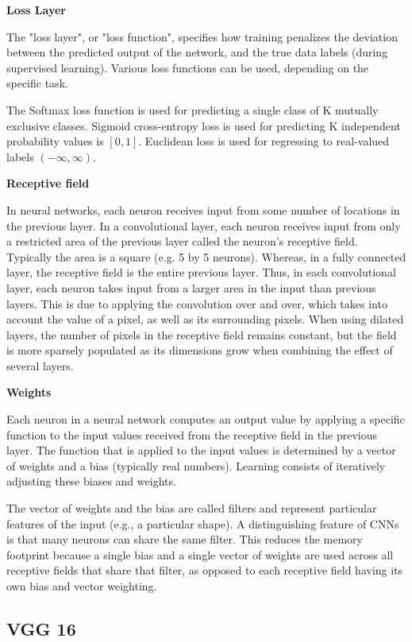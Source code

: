 \documentclass[11pt]{article}
\begin{document}
	\textbf{Loss Layer}

	The "loss layer", or "loss function", specifies how training penalizes the
	deviation between the predicted output of the network, and the true data
	labels (during supervised learning). Various loss functions can be used,
	depending on the specific task.

	The Softmax loss function is used for predicting a single class of K
	mutually exclusive classes. Sigmoid cross-entropy loss is used for
	predicting K independent probability values is $[0, 1]$.  Euclidean loss is
	used for regressing to real-valued labels $(- \infty, \infty)$.

	\textbf{Receptive field}

	In neural networks, each neuron receives input from some number of locations
	in the previous layer. In a convolutional layer, each neuron receives input
	from only a restricted area of the previous layer called the neuron's
	receptive field. Typically the area is a square (e.g. 5 by 5 neurons).
	Whereas, in a fully connected layer, the receptive field is the entire
	previous layer. Thus, in each convolutional layer, each neuron takes input
	from a larger area in the input than previous layers. This is due to
	applying the convolution over and over, which takes into account the value
	of a pixel, as well as its surrounding pixels. When using dilated layers,
	the number of pixels in the receptive field remains constant, but the field
	is more sparsely populated as its dimensions grow when combining the effect
	of several layers.

	\textbf{Weights}

	Each neuron in a neural network computes an output value by applying a
	specific function to the input values received from the receptive field in
	the previous layer. The function that is applied to the input values is
	determined by a vector of weights and a bias (typically real numbers).
	Learning consists of iteratively adjusting these biases and weights.

	The vector of weights and the bias are called filters and represent
	particular features of the input (e.g., a particular shape). A
	distinguishing feature of CNNs is that many neurons can share the same
	filter. This reduces the memory footprint because a single bias and a single
	vector of weights are used across all receptive fields that share that
	filter, as opposed to each receptive field having its own bias and vector
	weighting.

	\subsection{VGG 16}
\end{document}
